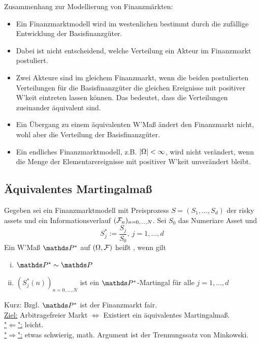 Zusammenhang zur Modellierung von Finanzmärkten:
\begin{itemize}
	\item Ein Finanzmarktmodell wird im westenlichen bestimmt durch die zufällige Entwicklung der Basisfinanzgüter.
	\item Dabei ist nicht entscheidend, welche Verteilung ein Akteur im Finanzmarkt postuliert.
	\item Zwei Akteure sind im gleichem Finanzmarkt, wenn die beiden postulierten Verteilungen für die Basisfinanzgüter die gleichen Ereignisse mit positiver W'keit eintreten lassen können.
	Das bedeutet, dass die Verteilungen zueinander äquivalent sind.
	\item Ein Übergang zu einem äquivalenten W'Maß ändert den Finanzmarkt nicht, wohl aber die Verteilung der Basisfinanzgüter.
	\item Ein endliches Finanzmarktmodell, z.B. $\left\vert\Omega\right\vert<\infty$, wird nicht verändert, wenn die Menge der Elementarereignisse mit positiver W'keit unverändert bleibt.
\end{itemize}
\newpage
\subsection{Äquivalentes Martingalmaß}
\label{sub:eq_martingalmas}
Gegeben sei ein Finanzmarktmodell mit Preisprozess $S=(S_1,\dots,S_d)$ der risky assets und ein Informationsverlauf $(\mathcal{F}_n)_{n=0,\dots,N}$.
Sei $S_0$ das Numeriare Asset und
\[
S_j^*:= \frac{S_j}{S_0},~j=1,\dots,d
\]
Ein W'Maß $\Pw^*$ auf $(\Omega,\mathcal{F})$ heißt , wenn gilt 
\begin{enumerate}[(i)]
	\item $\Pw^* \sim \Pw$
	\item $(S_j^*(n))_{n=0,\dots,N}$ ist ein $\Pw^*$-Martingal für alle $j=1,\dots,d$
\end{enumerate}
Kurz: Bzgl. $\Pw^*$ ist der Finanzmarkt fair.\\

\uline{Ziel:} Arbitragefreier Markt $\Leftrightarrow$ Existiert ein äquivalentes Martingalmaß.\\
\uline{"$\Leftarrow$":} leicht.\\
\uline{"$\Rightarrow$":} etwas schwierig, math. Argument ist der Trennungssatz von Minkowski. 


